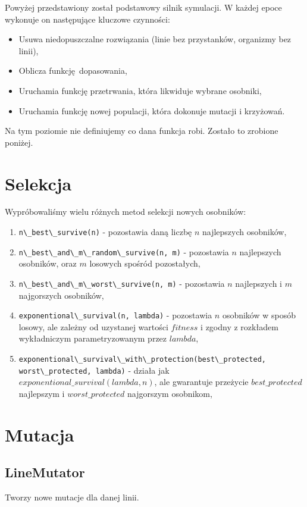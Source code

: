 \documentclass[12pt,a4paper,openright]{mwrep}
\begin{document}
	Powyżej przedstawiony został podstawowy silnik symulacji. W każdej epoce wykonuje on następujące kluczowe czynności:
	\begin{itemize}
		\item Usuwa niedopuszczalne rozwiązania (linie bez przystanków, organizmy bez linii),
		\item Oblicza funkcję dopasowania,
		\item Uruchamia funkcję przetrwania, która likwiduje wybrane osobniki,
		\item Uruchamia funkcję nowej populacji, która dokonuje mutacji i krzyżowań.
	\end{itemize}

	Na tym poziomie nie definiujemy co dana funkcja robi. Zostało to zrobione poniżej.

\section{Selekcja}
Wypróbowaliśmy wielu różnych metod selekcji nowych osobników:
\begin{enumerate}
    \item \lstinline{n\_best\_survive(n)} - pozostawia daną liczbę $n$ najlepszych osobników,
    \item \lstinline{n\_best\_and\_m\_random\_survive(n, m)} - pozostawia $n$ najlepszych osobników, oraz $m$ losowych spośród pozostałych,
    \item \lstinline{n\_best\_and\_m\_worst\_survive(n, m)} - pozostawia $n$ najlepszych i $m$ najgorszych osobników,
    \item \lstinline{exponentional\_survival(n, lambda)} - pozostawia $n$ osobników w sposób losowy, ale zależny od uzystanej wartości $fitness$ i zgodny z rozkładem wykładniczym parametryzowanym przez $lambda$,
    \item \lstinline{exponentional\_survival\_with\_protection(best\_protected, worst\_protected, lambda)} - działa jak $exponentional\_survival(lambda, n)$, ale gwarantuje przeżycie $best\_protected$ najlepszym i $worst\_protected$ najgorszym osobnikom,
\end{enumerate}

\section{Mutacja}

\subsection{LineMutator}
Tworzy nowe mutacje dla danej linii.
\end{document}
